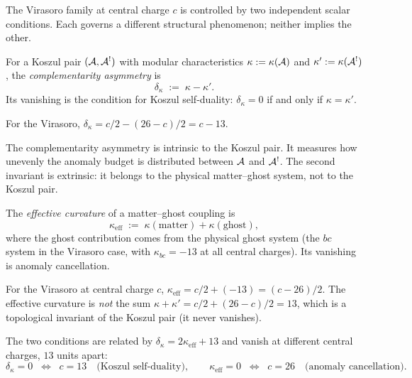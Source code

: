 The Virasoro family at central charge $c$ is controlled by two
independent scalar conditions. Each governs a different
structural phenomenon; neither implies the other.

\begin{definition}
\label{def:complementarity-asymmetry}
\label{def:delta-kappa-vs-kappa-eff}
For a Koszul pair $(\mathcal{A}, \mathcal{A}^!)$ with modular characteristics
$\kappa := \kappa(\mathcal{A})$ and $\kappa' := \kappa(\mathcal{A}^!)$, the
\emph{complementarity asymmetry} is
\begin{equation}\label{eq:g9-delta-kappa}
\delta_\kappa \;:=\; \kappa - \kappa'.
\end{equation}
Its vanishing is the condition for Koszul self-duality:
$\delta_\kappa = 0$ if and only if $\kappa = \kappa'$.
\end{definition}

For the Virasoro, $\delta_\kappa = c/2 - (26-c)/2 = c - 13$.

The complementarity asymmetry is intrinsic to the Koszul
pair. It measures how unevenly the anomaly budget is
distributed between $\mathcal{A}$ and $\mathcal{A}^!$. The second
invariant is extrinsic: it belongs to the physical
matter--ghost system, not to the Koszul pair.

\begin{definition}
\label{def:effective-curvature}
The \emph{effective curvature} of a matter--ghost coupling is
\begin{equation}\label{eq:g9-kappa-eff}
\kappa_{\mathrm{eff}} \;:=\;
\kappa(\mathrm{matter}) + \kappa(\mathrm{ghost}),
\end{equation}
where the ghost contribution comes from the physical ghost
system (the $bc$ system in the Virasoro case, with
$\kappa_{bc} = -13$ at all central charges). Its vanishing
is anomaly cancellation.
\end{definition}

For the Virasoro at central charge $c$,
$\kappa_{\mathrm{eff}} = c/2 + (-13) = (c-26)/2$. The
effective curvature is \emph{not} the sum
$\kappa + \kappa' = c/2 + (26-c)/2 = 13$, which is a
topological invariant of the Koszul pair (it never vanishes).

The two conditions are related by
$\delta_\kappa = 2\kappa_{\mathrm{eff}} + 13$ and vanish
at different central charges, $13$ units apart:
\begin{equation}\label{eq:g9-two-invariants-vir}
\delta_\kappa = 0
\;\;\Longleftrightarrow\;\;
c = 13
\quad\text{(Koszul self-duality)},
\qquad
\kappa_{\mathrm{eff}} = 0
\;\;\Longleftrightarrow\;\;
c = 26
\quad\text{(anomaly cancellation)}.
\end{equation}

